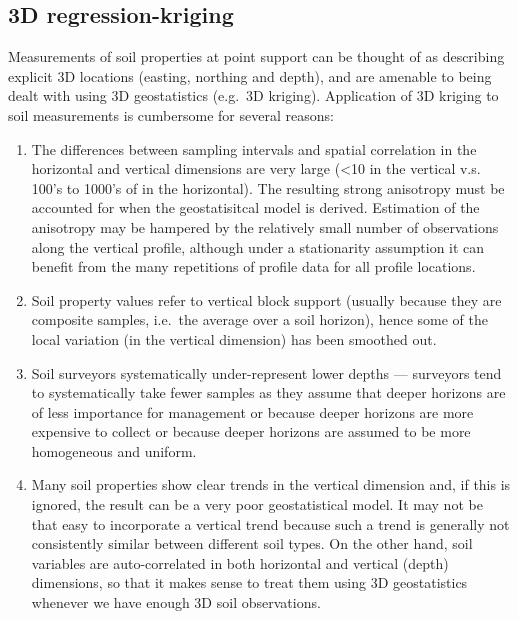 \documentclass[graybox,natbib,nospthms,UStrade]{svmono}
\begin{document}
\hypertarget{regression-kriging-3D}{%
\subsection{3D regression-kriging}\label{regression-kriging-3D}}

Measurements of soil properties at point support can be thought of as
describing explicit 3D locations (easting, northing and depth), and are
amenable to being dealt with using 3D geostatistics (e.g.~3D kriging).
Application of 3D kriging to soil measurements is cumbersome for several
reasons:

\begin{enumerate}
\def\labelenumi{\arabic{enumi}.}
\item
  The differences between sampling intervals and spatial correlation
  in the horizontal and vertical dimensions are very large (\textless{}10 in the
  vertical v.s. 100's to 1000's of in the horizontal). The resulting
  strong anisotropy must be accounted for when the geostatisitcal
  model is derived. Estimation of the anisotropy may be hampered by
  the relatively small number of observations along the vertical
  profile, although under a stationarity assumption it can benefit
  from the many repetitions of profile data for all profile locations.
\item
  Soil property values refer to vertical block support (usually
  because they are composite samples, i.e.~the average over a soil
  horizon), hence some of the local variation (in the
  vertical dimension) has been smoothed out.
\item
  Soil surveyors systematically under-represent lower depths ---
  surveyors tend to systematically take fewer samples as they assume
  that deeper horizons are of less importance for management or
  because deeper horizons are more expensive to collect or because
  deeper horizons are assumed to be more homogeneous and uniform.
\item
  Many soil properties show clear trends in the vertical
  dimension and, if this is ignored, the result can be a very poor
  geostatistical model. It may not be that easy to incorporate a
  vertical trend because such a trend is generally not consistently
  similar between different soil types. On the other hand, soil
  variables are auto-correlated in both horizontal and
  vertical (depth) dimensions, so that it makes sense to treat them
  using 3D geostatistics whenever we have enough 3D soil observations.
\end{enumerate}
\end{document}
